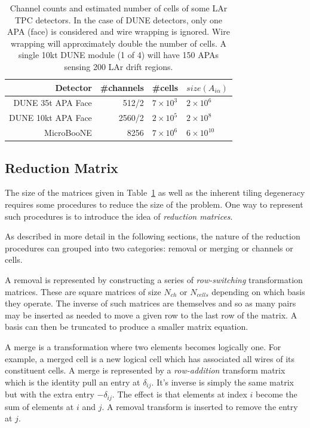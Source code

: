 \documentclass[letter]{article}
\def\mAchc{A_{i\alpha}}
\begin{document}
\begin{table}[htbp]
  \centering
  \begin{tabular}[h]{|r|r|l|l|}
    \hline
    Detector & \#channels & \#cells & $size(\mAchc)$ \\
    \hline
    \hline
    DUNE 35t APA Face & 512/2 & $7\times 10^3$ & $2\times 10^6$\\
    DUNE 10kt APA Face & 2560/2 & $2\times 10^5$ & $2\times 10^8$ \\
    MicroBooNE & 8256 & $7\times 10^6$ & $6\times 10^{10}$\\
    \hline
  \end{tabular}
  \caption{Channel counts and estimated number of cells of some LAr
    TPC detectors.
    In the case of DUNE detectors, only one APA (face) is considered
    and wire wrapping is ignored.
    Wire wrapping will approximately double the number of cells.
    A single 10kt DUNE module (1 of 4) will have 150 APAs sensing 200 LAr drift regions.}
  \label{tab:detectorcounts}
\end{table}

\subsection{Reduction Matrix}

The size of the matrices given in Table~\ref{tab:detectorcounts} as
well as the inherent tiling degeneracy requires some procedures to
reduce the size of the problem.
One way to represent such procedures is to introduce the idea of
\textit{reduction matrices}.


As described in more detail in the following sections, the nature of
the reduction procedures can grouped into two categories: removal or
merging or channels or cells.

A removal is represented by constructing a series of
\textit{row-switching} transformation matrices.
These are square matrices of size $N_{ch}$ or $N_{cells}$ depending on
which basis they operate.
The inverse of such matrices are themselves and so as many pairs may
be inserted as needed to move a given row to the last row of the matrix.
A basis can then be truncated to produce a smaller matrix equation.

A merge is a transformation where two elements becomes logically one.
For example, a merged cell is a new logical cell which has associated
all wires of its constituent cells.
A merge is represented by a \textit{row-addition} transform matrix
which is the identity pull an entry at $\delta_{ij}$.
It's inverse is simply the same matrix but with the extra entry $-\delta_{ij}$.
The effect is that elements at index $i$ become the sum of elements at
$i$ and $j$.
A removal transform is inserted to remove the entry at $j$.
\end{document}

